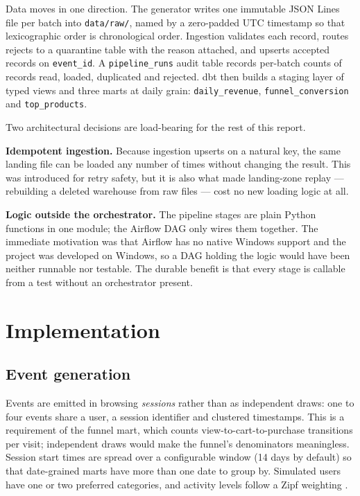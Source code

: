 \documentclass[conference]{IEEEtran}
\begin{document}
Data moves in one direction. The generator writes one immutable JSON Lines file
per batch into \texttt{data/raw/}, named by a zero-padded UTC timestamp so that
lexicographic order is chronological order. Ingestion validates each record,
routes rejects to a quarantine table with the reason attached, and upserts
accepted records on \texttt{event\_id}. A \texttt{pipeline\_runs} audit table
records per-batch counts of records read, loaded, duplicated and rejected. dbt
then builds a staging layer of typed views and three marts at daily grain:
\texttt{daily\_revenue}, \texttt{funnel\_conversion} and
\texttt{top\_products}.

Two architectural decisions are load-bearing for the rest of this report.

\textbf{Idempotent ingestion.} Because ingestion upserts on a natural key, the
same landing file can be loaded any number of times without changing the
result. This was introduced for retry safety, but it is also what made
landing-zone replay --- rebuilding a deleted warehouse from raw files --- cost
no new loading logic at all.

\textbf{Logic outside the orchestrator.} The pipeline stages are plain Python
functions in one module; the Airflow DAG only wires them together. The
immediate motivation was that Airflow has no native Windows support and the
project was developed on Windows, so a DAG holding the logic would have been
neither runnable nor testable. The durable benefit is that every stage is
callable from a test without an orchestrator present.

\section{Implementation}
\label{sec:impl}

\subsection{Event generation}
Events are emitted in browsing \emph{sessions} rather than as independent
draws: one to four events share a user, a session identifier and clustered
timestamps. This is a requirement of the funnel mart, which counts
view-to-cart-to-purchase transitions per visit; independent draws would make
the funnel's denominators meaningless. Session start times are spread over a
configurable window (14 days by default) so that date-grained marts have more
than one date to group by. Simulated users have one or two preferred
categories, and activity levels follow a Zipf weighting \cite{zipf}.
\end{document}
